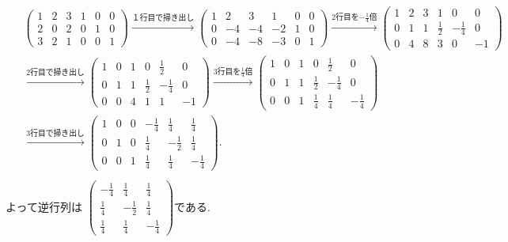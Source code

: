 \documentclass[dvipdfmx,a4paper,11pt]{article}
\theoremstyle{definition}
\begin{document}
 \begin{align*}
\begin{split}
 & \begin{pmatrix}
1 &2&3 &1 & 0 & 0\\
2 & 0 & 2 &0 & 1 & 0\\
3&2 &1 &0 & 0 & 1
 \end{pmatrix}
  \overset{\text{１行目で掃き出し}}{\longrightarrow} 
 \begin{pmatrix}
1 &2&3 &1 & 0 & 0\\
0  & -4 & -4 &-2& 1& 0\\
0& -4 &-8 &-3 & 0 & 1
 \end{pmatrix} 
  \overset{\text{2行目を$-\frac{1}{4}$倍}}{\longrightarrow} 
 \begin{pmatrix}
1 &2&3 &1 & 0 & 0\\
0  & 1 & 1 &\frac{1}{2} & -\frac{1}{4} & 0\\
0& 4 &8 &3 & 0 & -1
 \end{pmatrix} \\
 &\overset{\text{2行目で掃き出し}}{\longrightarrow} 
  \begin{pmatrix}
1 &0&1 &0 & \frac{1}{2} & 0\\
0  & 1 & 1 &\frac{1}{2} & -\frac{1}{4} & 0\\
0& 0 &4 &1 & 1 & -1
 \end{pmatrix} 
  \overset{\text{3行目を$\frac{1}{4}$倍}}{\longrightarrow} 
 \begin{pmatrix}
1 &0&1 &0 & \frac{1}{2} & 0\\
0  & 1 & 1 &\frac{1}{2} & -\frac{1}{4} & 0\\
0& 0 &1 &\frac{1}{4}  & \frac{1}{4}  & -\frac{1}{4} 
 \end{pmatrix} \\
  &\overset{\text{3行目で掃き出し}}{\longrightarrow} 
  \begin{pmatrix}
1 &0&0 &-\frac{1}{4}  & \frac{1}{4}  & \frac{1}{4} \\
0  & 1 & 0&\frac{1}{4}  & -\frac{1}{2} & \frac{1}{4} \\
0& 0 &1 &\frac{1}{4}  & \frac{1}{4}  & -\frac{1}{4} 
 \end{pmatrix}. \\
\end{split}
\end{align*}
よって逆行列は
$\begin{pmatrix}
-\frac{1}{4}  & \frac{1}{4}  & \frac{1}{4} \\
\frac{1}{4}  & -\frac{1}{2} & \frac{1}{4} \\
\frac{1}{4}  & \frac{1}{4}  & -\frac{1}{4} 
 \end{pmatrix} 
 $である.
  \vspace{11pt}
\end{document}

